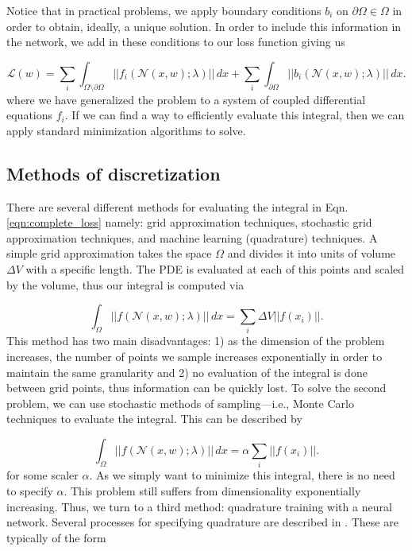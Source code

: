 \documentclass{CUP-JNL-DTM}%
\theoremstyle{definition}
\numberwithin{equation}{section}
\newcommand{\loss}{\mathcal{L}}
\newcommand{\net}{\mathcal{N}}
\begin{document}
Notice that in practical problems, we apply boundary conditions $b_i$ on $\partial \Omega \in \Omega$ in order to obtain, ideally, a unique solution. In order to include this information in the network, we add in these conditions to our loss function giving us 

\begin{equation}
	\loss(w) = \sum_i\int_{\Omega\setminus\partial\Omega} ||f_i(\net(x,w); \lambda)||\,dx + \sum_i\int_{\partial\Omega} ||b_i(\net(x,w); \lambda)||\,dx.
	\label{eqn:complete_loss} 
\end{equation}
where we have generalized the problem to a system of coupled differential equations $f_i$. If we can find a way to efficiently evaluate this integral, then we can apply standard minimization algorithms to solve. 

\subsection{Methods of discretization}

There are several different methods for evaluating the integral in Eqn. \ref{eqn:complete_loss} namely: grid approximation techniques, stochastic grid approximation techniques, and machine learning (quadrature) techniques. A simple grid approximation takes the space $\Omega$ and divides it into units of volume $\Delta V$ with a specific length. The PDE is evaluated at each of this points and scaled by the volume, thus our integral is computed via 

\begin{equation}
	\int_{\Omega} ||f(\net(x,w); \lambda)||\,dx = \sum_i \Delta V ||f(x_i)||.
\end{equation}
This method has two main disadvantages: 1) as the dimension of the problem increases, the number of points we sample increases exponentially in order to maintain the same granularity and 2) no evaluation of the integral is done between grid points, thus information can be quickly lost. To solve the second problem, we can use stochastic methods of sampling---i.e., Monte Carlo techniques to evaluate the integral. This can be described by 

\begin{equation}
	\int_{\Omega} ||f(\net(x,w); \lambda)||\,dx = \alpha \sum_i ||f(x_i)||.
\end{equation}
for some scaler $\alpha$. As we simply want to minimize this integral, there is no need to specify $\alpha$. This problem still suffers from dimensionality exponentially increasing. Thus, we turn to a third method: quadrature training with a neural network. Several processes for specifying quadrature are described in \cite{riveraQuadratureRulesSolving2022}. These are typically of the form 
\end{document}
